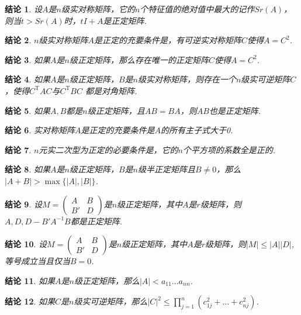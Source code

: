 \documentclass[UTF8]{article}
\newtheorem{ccl}{结论}[subsection]
\begin{document}
\begin{ccl}
  设$A$是$n$级实对称矩阵，它的$n$个特征值的绝对值中最大的记作$Sr(A)$，则当$t>Sr(A)$时，$tI+A$是正定矩阵.
\end{ccl}
\begin{ccl}
  $n$级实对称矩阵$A$是正定的充要条件是，有可逆实对称矩阵$C$使得$A=C^2$.
\end{ccl}
\begin{ccl}
  如果$A$是$n$级正定矩阵，那么存在唯一的正定矩阵$C$使得$A=C^2$.
\end{ccl}
\begin{ccl}
  如果$A$是$n$级正定矩阵，$B$是$n$级实对称矩阵，则存在一个$n$级实可逆矩阵$C$，使得$C^{\mathrm{T}}AC$与$C^{\mathrm{T}}BC$
  都是对角矩阵.
\end{ccl}
\begin{ccl}
  如果$A,B$都是$n$级正定矩阵，且$AB=BA$，则$AB$也是正定矩阵.
\end{ccl}
\begin{ccl}
  实对称矩阵$A$是正定的充要条件是$A$的所有主子式大于0.
\end{ccl}
\begin{ccl}
  $n$元实二次型为正定的必要条件是，它的$n$个平方项的系数全是正的.
\end{ccl}
\begin{ccl}
  如果$A$是$n$级正定矩阵，$B$是$n$级半正定矩阵且$B\ne 0$，那么$|A+B|>\max\{|A|,|B|\}$.
\end{ccl}
\begin{ccl}
  设$M=\begin{pmatrix}A&B\\B'&D \end{pmatrix}$是$n$级正定矩阵，其中$A$是$r$级矩阵，则$A,D,D-B'A^{-1}B$都是正定矩阵.
\end{ccl}
\begin{ccl}
  设$M=\begin{pmatrix}A&B\\B'&D \end{pmatrix}$是$n$级正定矩阵，其中$A$是$r$级矩阵，则$|M|\le|A||D|$,
  等号成立当且仅当$B=0$.
\end{ccl}
\begin{ccl}
  如果$A$是$n$级正定矩阵，那么$|A|<a_{11}\ldots a_{nn}$.
\end{ccl}
\begin{ccl}
  如果$C$是$n$级实可逆矩阵，那么$|C|^2 \le \prod\limits_{j=1}^n(c_{1j}^2+\ldots+c_{nj}^2)$.
\end{ccl}
\end{document}
